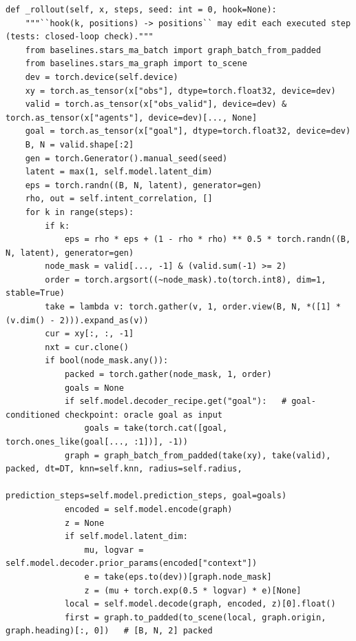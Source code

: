 \documentclass[10pt]{article}
\begin{document}
\par\smallskip{}\par\nopagebreak
\begin{lstlisting}[aboveskip=2pt]
def _rollout(self, x, steps, seed: int = 0, hook=None):
    """``hook(k, positions) -> positions`` may edit each executed step (tests: closed-loop check)."""
    from baselines.stars_ma_batch import graph_batch_from_padded
    from baselines.stars_ma_graph import to_scene
    dev = torch.device(self.device)
    xy = torch.as_tensor(x["obs"], dtype=torch.float32, device=dev)
    valid = torch.as_tensor(x["obs_valid"], device=dev) & torch.as_tensor(x["agents"], device=dev)[..., None]
    goal = torch.as_tensor(x["goal"], dtype=torch.float32, device=dev)
    B, N = valid.shape[:2]
    gen = torch.Generator().manual_seed(seed)
    latent = max(1, self.model.latent_dim)
    eps = torch.randn((B, N, latent), generator=gen)
    rho, out = self.intent_correlation, []
    for k in range(steps):
        if k:
            eps = rho * eps + (1 - rho * rho) ** 0.5 * torch.randn((B, N, latent), generator=gen)
        node_mask = valid[..., -1] & (valid.sum(-1) >= 2)
        order = torch.argsort((~node_mask).to(torch.int8), dim=1, stable=True)
        take = lambda v: torch.gather(v, 1, order.view(B, N, *([1] * (v.dim() - 2))).expand_as(v))
        cur = xy[:, :, -1]
        nxt = cur.clone()
        if bool(node_mask.any()):
            packed = torch.gather(node_mask, 1, order)
            goals = None
            if self.model.decoder_recipe.get("goal"):   # goal-conditioned checkpoint: oracle goal as input
                goals = take(torch.cat([goal, torch.ones_like(goal[..., :1])], -1))
            graph = graph_batch_from_padded(take(xy), take(valid), packed, dt=DT, knn=self.knn, radius=self.radius,
                                            prediction_steps=self.model.prediction_steps, goal=goals)
            encoded = self.model.encode(graph)
            z = None
            if self.model.latent_dim:
                mu, logvar = self.model.decoder.prior_params(encoded["context"])
                e = take(eps.to(dev))[graph.node_mask]
                z = (mu + torch.exp(0.5 * logvar) * e)[None]
            local = self.model.decode(graph, encoded, z)[0].float()
            first = graph.to_padded(to_scene(local, graph.origin, graph.heading)[:, 0])   # [B, N, 2] packed

\end{lstlisting}
\end{document}
